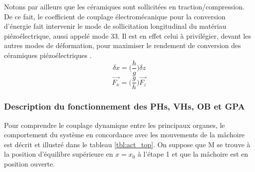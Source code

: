 Notons par ailleurs que les céramiques sont sollicitées en traction/compression. De ce fait, le coefficient de couplage électromécanique pour la conversion d'énergie fait intervenir le mode de sollicitation longitudinal du matériau piézoélectrique, aussi appelé mode 33. Il est en effet celui à privilégier, devant les autres modes de déformation, pour maximiser le rendement de conversion des céramiques piézoélectriques \cite{OmegaPiezo2022,Zhang2018,Fujishima1984}.
\begin{equation}
	\delta x = \biggl( \frac{h}{g} \biggr) \delta z
\label{eq_flextenseur_cinématique}
\end{equation}
\begin{equation}
	\vec{F_x} = \biggl(  \frac{g}{h} \biggr) \vec{F_z}
\label{eq_flextenseur_statique}
\end{equation}
	\subsubsection{Description du fonctionnement des PHs, VHs, OB et GPA}
	\label{subsec:2.1.2.b_Description du fonctionnement du système}
Pour comprendre le couplage dynamique entre les principaux organes, le comportement du système en concordance avec les mouvements de la mâchoire est décrit et illustré dans le tableau \ref{tbl:act_top}. On suppose que M se trouve à la position d'équilibre supérieure en $x=x_0$ à l'étape 1 et que la mâchoire est en position ouverte. 

